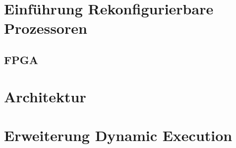 
\section{Einführung Rekonfigurierbare Prozessoren}

\subsection{FPGA}

\section{Architektur}

\section{Erweiterung Dynamic Execution}